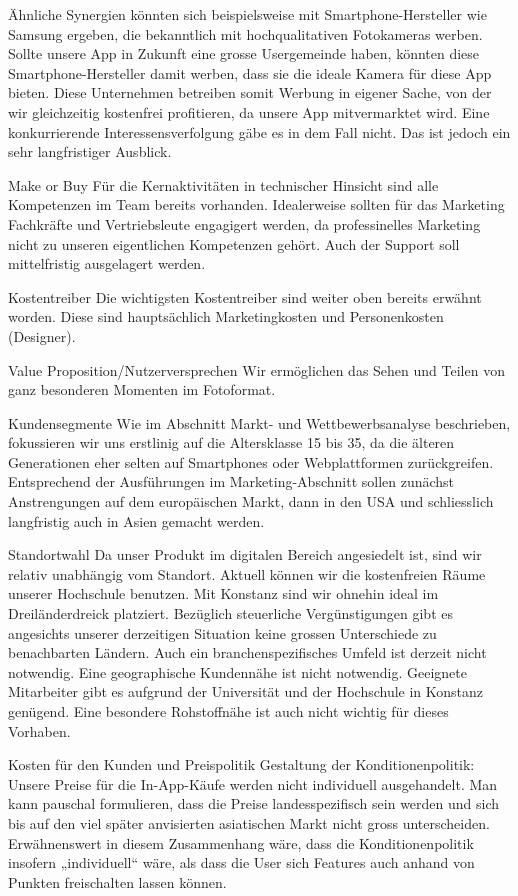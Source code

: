 Ähnliche Synergien könnten sich beispielsweise mit Smartphone-Hersteller wie Samsung ergeben, die bekanntlich mit hochqualitativen Fotokameras werben. Sollte unsere App in Zukunft eine grosse Usergemeinde haben, könnten diese Smartphone-Hersteller damit werben, dass sie die ideale Kamera für diese App bieten. Diese Unternehmen betreiben somit Werbung in eigener Sache, von der wir gleichzeitig kostenfrei profitieren, da unsere App mitvermarktet wird. Eine konkurrierende Interessensverfolgung gäbe es in dem Fall nicht. Das ist jedoch ein sehr langfristiger Ausblick.


Make or Buy
Für die Kernaktivitäten in technischer Hinsicht sind alle Kompetenzen im Team bereits vorhanden. Idealerweise sollten für das Marketing Fachkräfte und Vertriebsleute engagigert werden, da professinelles Marketing nicht zu unseren eigentlichen Kompetenzen gehört. Auch der Support soll mittelfristig ausgelagert werden.


Kostentreiber
Die wichtigsten Kostentreiber sind weiter oben bereits erwähnt worden. Diese sind hauptsächlich Marketingkosten und Personenkosten (Designer).


Value Proposition/Nutzerversprechen
Wir ermöglichen das Sehen und Teilen von ganz besonderen Momenten im Fotoformat.


Kundensegmente
Wie im Abschnitt Markt- und Wettbewerbsanalyse beschrieben, fokussieren wir uns erstlinig auf die Altersklasse 15 bis 35, da die älteren Generationen eher selten auf Smartphones oder Webplattformen zurückgreifen. Entsprechend der Ausführungen im Marketing-Abschnitt sollen zunächst Anstrengungen auf dem europäischen Markt, dann in den USA und schliesslich langfristig auch in Asien gemacht werden.


Standortwahl
Da unser Produkt im digitalen Bereich angesiedelt ist, sind wir relativ unabhängig vom Standort. Aktuell können wir die kostenfreien Räume unserer Hochschule benutzen. Mit Konstanz sind wir ohnehin ideal im Dreiländerdreick platziert. Bezüglich steuerliche Vergünstigungen gibt es angesichts unserer derzeitigen Situation keine grossen Unterschiede zu benachbarten Ländern. Auch ein branchenspezifisches Umfeld ist derzeit nicht notwendig. Eine geographische Kundennähe ist nicht notwendig. Geeignete Mitarbeiter gibt es aufgrund der Universität und der Hochschule in Konstanz genügend. Eine besondere Rohstoffnähe ist auch nicht wichtig für dieses Vorhaben.



Kosten für den Kunden und Preispolitik
Gestaltung der Konditionenpolitik: Unsere Preise für die In-App-Käufe werden nicht individuell ausgehandelt. Man kann pauschal formulieren, dass die Preise landesspezifisch sein werden und sich bis auf den viel später anvisierten asiatischen Markt nicht gross unterscheiden.
Erwähnenswert in diesem Zusammenhang wäre, dass die Konditionenpolitik insofern „individuell“ wäre, als dass die User sich Features auch anhand von Punkten freischalten lassen können.

